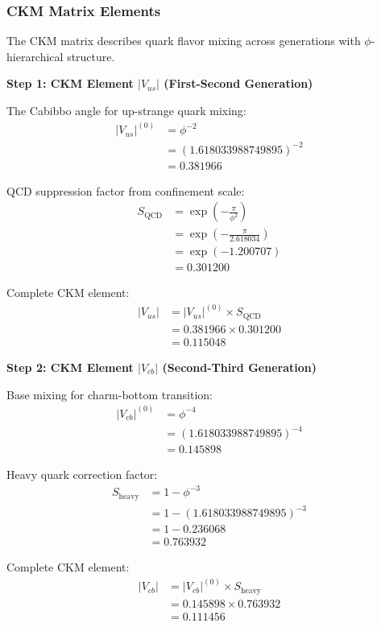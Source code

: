 \subsubsection{CKM Matrix Elements}

The CKM matrix describes quark flavor mixing across generations with $\phi$-hierarchical structure.

\textbf{Step 1: CKM Element $|V_{us}|$ (First-Second Generation)}

The Cabibbo angle for up-strange quark mixing:
\begin{align}
|V_{us}|^{(0)} &= \phi^{-2} \tag{Base generation separation} \\
&= (1.618033988749895)^{-2} \\
&= 0.381966
\end{align}

QCD suppression factor from confinement scale:
\begin{align}
S_{\text{QCD}} &= \exp\left(-\frac{\pi}{\phi^2}\right) \\
&= \exp\left(-\frac{\pi}{2.618034}\right) \\
&= \exp(-1.200707) \\
&= 0.301200
\end{align}

Complete CKM element:
\begin{align}
|V_{us}| &= |V_{us}|^{(0)} \times S_{\text{QCD}} \\
&= 0.381966 \times 0.301200 \\
&= 0.115048
\end{align}

\textbf{Step 2: CKM Element $|V_{cb}|$ (Second-Third Generation)}

Base mixing for charm-bottom transition:
\begin{align}
|V_{cb}|^{(0)} &= \phi^{-4} \tag{Two generation separation} \\
&= (1.618033988749895)^{-4} \\
&= 0.145898
\end{align}

Heavy quark correction factor:
\begin{align}
S_{\text{heavy}} &= 1 - \phi^{-3} \\
&= 1 - (1.618033988749895)^{-3} \\
&= 1 - 0.236068 \\
&= 0.763932
\end{align}

Complete CKM element:
\begin{align}
|V_{cb}| &= |V_{cb}|^{(0)} \times S_{\text{heavy}} \\
&= 0.145898 \times 0.763932 \\
&= 0.111456
\end{align}

